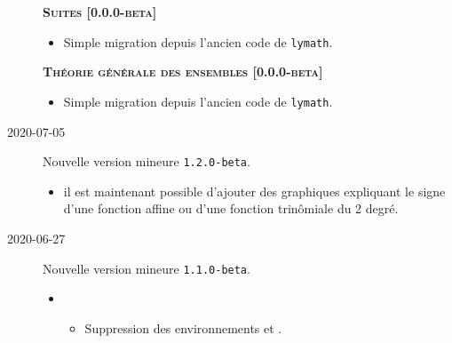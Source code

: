 \documentclass[12pt,a4paper]{book}
\begin{document}
\begin{description}
    
    \separation
    
    
    
    
    \begin{center}
        \textbf{\textsc{Suites [0.0.0-beta]}}
    \end{center}
    
    \begin{itemize}[itemsep=.5em]
        \item Simple migration depuis l'ancien code de \verb+lymath+.
    \end{itemize}
    
    
    \separation
    
    
    
    
    \begin{center}
        \textbf{\textsc{Théorie générale des ensembles [0.0.0-beta]}}
    \end{center}
    
    \begin{itemize}[itemsep=.5em]
        \item Simple migration depuis l'ancien code de \verb+lymath+.
    \end{itemize}
    
    
    \separation


    \medskip
    \item[2020-07-05] Nouvelle version mineure \verb+1.2.0-beta+.
    
    \begin{itemize}[itemsep=.5em]
        \item {}
              il est maintenant possible d'ajouter des graphiques expliquant le signe d'une fonction affine ou d'une fonction trinômiale du 2\ieme{} degré.
    \end{itemize}

    \medskip
    \item[2020-06-27] Nouvelle version mineure \verb+1.1.0-beta+.
    
    \begin{itemize}[itemsep=.5em]
        \item {}
        \begin{itemize}[itemsep=.5em]
            \item Suppression des environnements  et .
    

\end{itemize}
\end{itemize}
\end{description}
\end{document}
